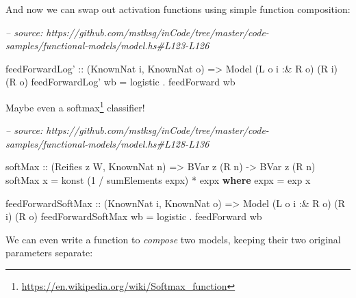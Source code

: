\documentclass[]{article}
\newenvironment{Shaded}{}{}
\newcommand{\CommentTok}[1]{\textcolor[rgb]{0.38,0.63,0.69}{\textit{#1}}}
\newcommand{\DataTypeTok}[1]{\textcolor[rgb]{0.56,0.13,0.00}{#1}}
\newcommand{\DecValTok}[1]{\textcolor[rgb]{0.25,0.63,0.44}{#1}}
\newcommand{\FunctionTok}[1]{\textcolor[rgb]{0.02,0.16,0.49}{#1}}
\newcommand{\KeywordTok}[1]{\textcolor[rgb]{0.00,0.44,0.13}{\textbf{#1}}}
\newcommand{\NormalTok}[1]{#1}
\newcommand{\OtherTok}[1]{\textcolor[rgb]{0.00,0.44,0.13}{#1}}
\renewcommand{\href}[2]{#2\footnote{\url{#1}}}
\begin{document}
And now we can swap out activation functions using simple function composition:

\begin{Shaded}
\begin{Highlighting}[]
\CommentTok{-- source: https://github.com/mstksg/inCode/tree/master/code-samples/functional-models/model.hs#L123-L126}

\NormalTok{feedForwardLog'}
\OtherTok{    ::}\NormalTok{ (}\DataTypeTok{KnownNat}\NormalTok{ i, }\DataTypeTok{KnownNat}\NormalTok{ o)}
    \OtherTok{=>} \DataTypeTok{Model}\NormalTok{ (}\DataTypeTok{L}\NormalTok{ o i }\FunctionTok{:&} \DataTypeTok{R}\NormalTok{ o) (}\DataTypeTok{R}\NormalTok{ i) (}\DataTypeTok{R}\NormalTok{ o)}
\NormalTok{feedForwardLog' wb }\FunctionTok{=}\NormalTok{ logistic }\FunctionTok{.}\NormalTok{ feedForward wb}
\end{Highlighting}
\end{Shaded}

Maybe even a \href{https://en.wikipedia.org/wiki/Softmax_function}{softmax}
classifier!

\begin{Shaded}
\begin{Highlighting}[]
\CommentTok{-- source: https://github.com/mstksg/inCode/tree/master/code-samples/functional-models/model.hs#L128-L136}

\OtherTok{softMax ::}\NormalTok{ (}\DataTypeTok{Reifies}\NormalTok{ z }\DataTypeTok{W}\NormalTok{, }\DataTypeTok{KnownNat}\NormalTok{ n) }\OtherTok{=>} \DataTypeTok{BVar}\NormalTok{ z (}\DataTypeTok{R}\NormalTok{ n) }\OtherTok{->} \DataTypeTok{BVar}\NormalTok{ z (}\DataTypeTok{R}\NormalTok{ n)}
\NormalTok{softMax x }\FunctionTok{=}\NormalTok{ konst (}\DecValTok{1} \FunctionTok{/}\NormalTok{ sumElements expx) }\FunctionTok{*}\NormalTok{ expx}
  \KeywordTok{where}
\NormalTok{    expx }\FunctionTok{=}\NormalTok{ exp x}

\NormalTok{feedForwardSoftMax}
\OtherTok{    ::}\NormalTok{ (}\DataTypeTok{KnownNat}\NormalTok{ i, }\DataTypeTok{KnownNat}\NormalTok{ o)}
    \OtherTok{=>} \DataTypeTok{Model}\NormalTok{ (}\DataTypeTok{L}\NormalTok{ o i }\FunctionTok{:&} \DataTypeTok{R}\NormalTok{ o) (}\DataTypeTok{R}\NormalTok{ i) (}\DataTypeTok{R}\NormalTok{ o)}
\NormalTok{feedForwardSoftMax wb }\FunctionTok{=}\NormalTok{ logistic }\FunctionTok{.}\NormalTok{ feedForward wb}
\end{Highlighting}
\end{Shaded}

We can even write a function to \emph{compose} two models, keeping their two
original parameters separate:
\end{document}
